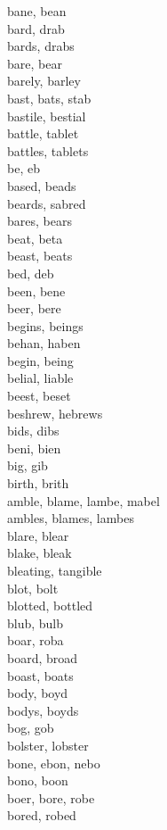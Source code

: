 bane, bean\\
bard, drab\\
bards, drabs\\
bare, bear\\
barely, barley\\
bast, bats, stab\\
bastile, bestial\\
battle, tablet\\
battles, tablets\\
be, eb\\
based, beads\\
beards, sabred\\
bares, bears\\
beat, beta\\
beast, beats\\
bed, deb\\
been, bene\\
beer, bere\\
begins, beings\\
behan, haben\\
begin, being\\
belial, liable\\
beest, beset\\
beshrew, hebrews\\
bids, dibs\\
beni, bien\\
big, gib\\
birth, brith\\
amble, blame, lambe, mabel\\
ambles, blames, lambes\\
blare, blear\\
blake, bleak\\
bleating, tangible\\
blot, bolt\\
blotted, bottled\\
blub, bulb\\
boar, roba\\
board, broad\\
boast, boats\\
body, boyd\\
bodys, boyds\\
bog, gob\\
bolster, lobster\\
bone, ebon, nebo\\
bono, boon\\
boer, bore, robe\\
bored, robed\\
